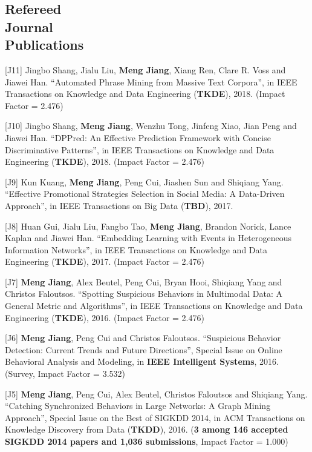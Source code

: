 \documentclass[margin, 9pt]{res}
\begin{document}
\begin{resume}

\section{Refereed \\ Journal \\ Publications}

[J11] Jingbo Shang, Jialu Liu, \textbf{Meng Jiang}, Xiang Ren, Clare R. Voss and Jiawei Han. ``Automated Phrase Mining from Massive Text Corpora'', in IEEE Transactions on Knowledge and Data Engineering (\textbf{TKDE}), 2018. (Impact Factor = 2.476)

[J10] Jingbo Shang, \textbf{Meng Jiang}, Wenzhu Tong, Jinfeng Xiao, Jian Peng and Jiawei Han. ``DPPred: An Effective Prediction Framework with Concise Discriminative Patterns'', in IEEE Transactions on Knowledge and Data Engineering (\textbf{TKDE}), 2018. (Impact Factor = 2.476)

[J9] Kun Kuang, \textbf{Meng Jiang}, Peng Cui, Jiashen Sun and Shiqiang Yang. ``Effective Promotional Strategies Selection in Social Media: A Data-Driven Approach'', in IEEE Transactions on Big Data (\textbf{TBD}), 2017.

[J8] Huan Gui, Jialu Liu, Fangbo Tao, \textbf{Meng Jiang}, Brandon Norick, Lance Kaplan and Jiawei Han. ``Embedding Learning with Events in Heterogeneous Information Networks'', in IEEE Transactions on Knowledge and Data Engineering (\textbf{TKDE}), 2017. (Impact Factor = 2.476)

[J7] \textbf{Meng Jiang}, Alex Beutel, Peng Cui, Bryan Hooi, Shiqiang Yang and Christos Faloutsos. ``Spotting Suspicious Behaviors in Multimodal Data: A General Metric and Algorithms'', in IEEE Transactions on Knowledge and Data Engineering (\textbf{TKDE}), 2016. (Impact Factor = 2.476)

[J6] \textbf{Meng Jiang}, Peng Cui and Christos Faloutsos. ``Suspicious Behavior Detection: Current Trends and Future Directions'', Special Issue on Online Behavioral Analysis and Modeling, in \textbf{IEEE Intelligent Systems}, 2016. (Survey, Impact Factor = 3.532)

[J5] \textbf{Meng Jiang}, Peng Cui, Alex Beutel, Christos Faloutsos and Shiqiang Yang. ``Catching Synchronized Behaviors in Large Networks: A Graph Mining Approach'', Special Issue on the Best of SIGKDD 2014, in ACM Transactions on Knowledge Discovery from Data (\textbf{TKDD}), 2016. (\textbf{3 among 146 accepted SIGKDD 2014 papers and 1,036 submissions}, Impact Factor = 1.000)


\end{resume}
\end{document}
